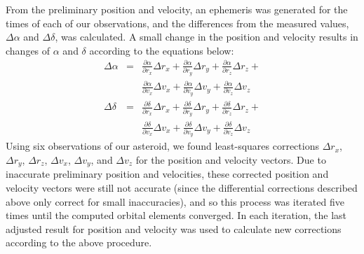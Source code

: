 \documentclass[12pt,journal,compsoc]{IEEEtran}
\begin{document}
From the preliminary position and velocity, an ephemeris was generated for the times of each of our observations, and the differences from the measured values, $\Delta \alpha$ and $\Delta \delta$, was calculated.
A small change in the position and velocity results in changes of $\alpha$ and $\delta$ according to the equations below:
\begin{eqnarray*}
\Delta \alpha &=& \frac{\partial \alpha}{\partial r_x} \Delta r_x + \frac{\partial \alpha}{\partial r_y} \Delta r_y + \frac{\partial \alpha}{\partial r_z} \Delta r_z + \\& &
\frac{\partial \alpha}{\partial v_x} \Delta v_x + \frac{\partial \alpha}{\partial v_y} \Delta v_y + \frac{\partial \alpha}{\partial v_z} \Delta v_z \\
\Delta \delta &=& \frac{\partial \delta}{\partial r_x} \Delta r_x + \frac{\partial \delta}{\partial r_y} \Delta r_y + \frac{\partial \delta}{\partial r_z} \Delta r_z + \\& &
\frac{\partial \delta}{\partial v_x} \Delta v_x + \frac{\partial \delta}{\partial v_y} \Delta v_y + \frac{\partial \delta}{\partial v_z} \Delta v_z
\end{eqnarray*}
Using six observations of our asteroid, we found least-squares corrections $\Delta r_x$, $\Delta r_y$, $\Delta r_z$, $\Delta v_x$, $\Delta v_y$, and $\Delta v_z$ for the position and velocity vectors.
Due to inaccurate preliminary position and velocities, these corrected position and velocity vectors were still not accurate (since the differential corrections described above only correct for small inaccuracies), and so this process was iterated five times until the computed orbital elements converged. In each iteration, the last adjusted result for position and velocity was used to calculate new corrections according to the 
above procedure.
\end{document}
